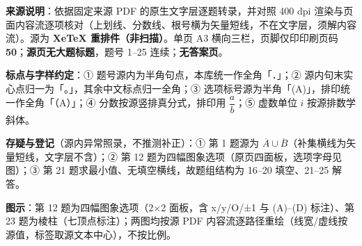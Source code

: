 


\begin{gktip}
\textbf{来源说明}：依据固定来源 PDF 的原生文字层逐题转录，并对照 400 dpi 渲染与页面内容流逐项核对（上划线、分数线、根号横为矢量短线，不在文字层，须解内容流）。源为 \textbf{XeTeX 重排件（非扫描）}。单页 A3 横向三栏，页脚仅印印刷页码 \textbf{50}；\textbf{源页无大题标题}，题号 1–25 连续；\textbf{无答案页}。

\textbf{标点与字样约定}：① 题号源内为半角句点，本库统一作全角「．」；② 源内句末实心点归一为「。」，其余中文标点归一全角；③ 选项标号源为半角「(A)」，排印统一作全角「（A）」；④ 分数按源竖排真分式，排印用 \(\dfrac{a}{b}\)；⑤ 虚数单位 \(i\) 按源排数学斜体。

\textbf{存疑与登记}（源内异常照录，不推测补正）：① 第 1 题源为 \(\overline{A}\cup\overline{B}\)（补集横线为矢量短线，文字层不含）；② 第 12 题为四幅图象选项（原页四面板，选项字母见图）；③ 第 21 题求最小值、无填空横线，故题组结构为 16–20 填空、21–25 解答。

\textbf{图示}：第 12 题为四幅图象选项（2×2 面板，含 x/y/O/±1 与 (A)–(D) 标注）、第 23 题为棱柱（七顶点标注）；两图均按源 PDF 内容流逐路径重绘（线宽/虚线按源值，标签取源文本中心），不按比例。
\end{gktip}


